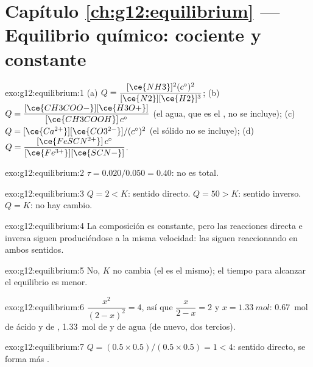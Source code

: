 \section*{Capítulo \ref{ch:g12:equilibrium} --- Equilibrio químico: cociente y constante}

\begin{solution}{exo:g12:equilibrium:1}
(a) $Q = \dfrac{[\ce{NH3}]^2 (c^\circ)^2}{[\ce{N2}][\ce{H2}]^3}$;
(b) $Q = \dfrac{[\ce{CH3COO-}][\ce{H3O+}]}{[\ce{CH3COOH}]\,c^\circ}$ (el
agua, que es el , no se incluye);
(c) $Q = [\ce{Ca^{2+}}][\ce{CO3^{2-}}]/(c^\circ)^2$ (el sólido no se incluye);
(d) $Q = \dfrac{[\ce{FeSCN^{2+}}]\,c^\circ}{[\ce{Fe^{3+}}][\ce{SCN-}]}$.
\end{solution}

\begin{solution}{exo:g12:equilibrium:2}
$\tau = 0.020/0.050 = 0.40$: no es total.
\end{solution}

\begin{solution}{exo:g12:equilibrium:3}
$Q = 2 < K$: sentido directo. $Q = 50 > K$: sentido inverso. $Q = K$: no
hay cambio.
\end{solution}

\begin{solution}{exo:g12:equilibrium:4}
La composición es constante, pero las reacciones directa e inversa
siguen produciéndose a la misma velocidad: las  siguen
reaccionando en ambos sentidos.
\end{solution}

\begin{solution}{exo:g12:equilibrium:5}
No, $K$ no cambia (el  es el mismo); el tiempo para alcanzar
el equilibrio es menor.
\end{solution}

\begin{solution}{exo:g12:equilibrium:6}
$\dfrac{x^2}{(2-x)^2} = 4$, así que $\dfrac{x}{2-x} = 2$ y
$x = \qty{1.33}{mol}$: \qty{0.67}{mol} de ácido y de ,
\qty{1.33}{mol} de  y de agua (de nuevo, dos tercios).
\end{solution}

\begin{solution}{exo:g12:equilibrium:7}
$Q = (0.5 \times 0.5)/(0.5 \times 0.5) = 1 < 4$: sentido directo, se
forma más .
\end{solution}


